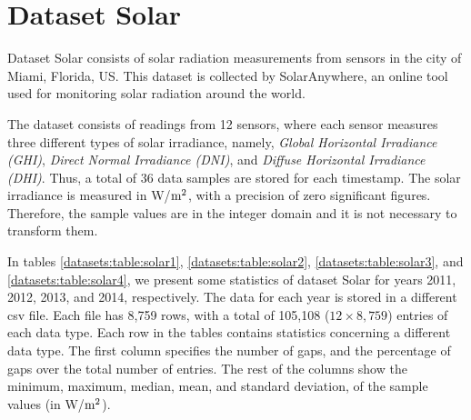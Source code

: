 
\vspace{-10pt}
\section{Dataset Solar}
\label{datasets:solar}
\newcommand{\unitSolar}{W/$\textnormal{m}^2$}

Dataset Solar \cite{dataset:solar} consists of solar radiation measurements from sensors in the city of Miami, Florida, US. This dataset is collected by SolarAnywhere, an online tool used for monitoring solar radiation around the world.


The dataset consists of readings from 12 sensors, where each sensor measures three different types of solar irradiance, namely, \textit{Global Horizontal Irradiance (GHI)}, \textit{Direct Normal Irradiance (DNI)}, and \textit{Diffuse Horizontal Irradiance (DHI)}. Thus, a total of 36 data samples are stored for each timestamp. The solar irradiance is measured in \unitSolar, with a precision of zero significant figures. Therefore, the sample values are in the integer domain and it is not necessary to transform them.


In tables \ref{datasets:table:solar1}, \ref{datasets:table:solar2}, \ref{datasets:table:solar3}, and \ref{datasets:table:solar4}, we present some statistics of dataset Solar for years 2011, 2012, 2013, and 2014, respectively. The data for each year is stored in a different csv file. Each file has 8,759 rows, with a total of 105,108 ($12\times8,759$) entries of each data type. Each row in the tables contains statistics concerning a different data type. The first column specifies the number of gaps, and the percentage of gaps over the total number of entries. The rest of the columns show the minimum, maximum, median, mean, and standard deviation, of the sample values (in \unitSolar).




